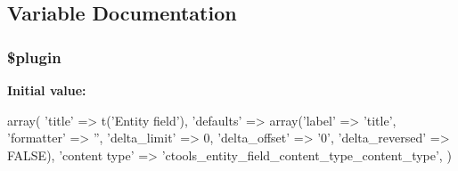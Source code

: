 \subsection{Variable Documentation}
\hypertarget{entity__field_8inc_ada8a7130088351710bb02ed622d6bf65}{
\subsubsection[{\$plugin}]{\setlength{\rightskip}{0pt plus 5cm}\$plugin}}
\label{entity__field_8inc_ada8a7130088351710bb02ed622d6bf65}
{\bfseries Initial value:}
\begin{DoxyCode}
 array(
  'title' => t('Entity field'),
  'defaults' => array('label' => 'title', 'formatter' => '', 'delta_limit' => 0, 
      'delta_offset' => '0', 'delta_reversed' => FALSE),
  'content type' => 'ctools_entity_field_content_type_content_type',
)
\end{DoxyCode}
